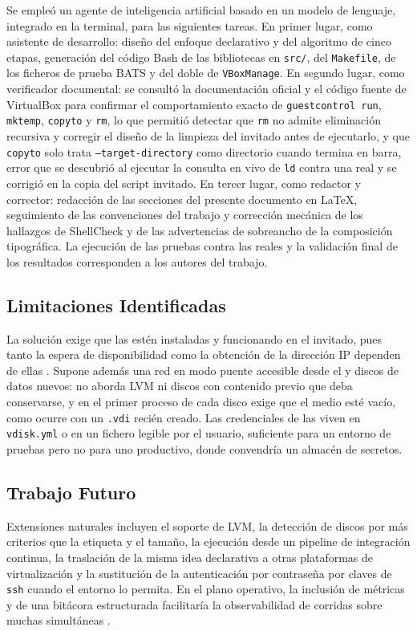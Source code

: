 Se empleó un agente de inteligencia artificial basado en un modelo de lenguaje, integrado en la terminal, para las siguientes tareas. En primer lugar, como asistente de desarrollo: diseño del enfoque declarativo y del algoritmo de cinco etapas, generación del código Bash de las bibliotecas en \texttt{src/}, del \texttt{Makefile}, de los ficheros de prueba BATS y del doble de \texttt{VBoxManage}. En segundo lugar, como verificador documental: se consultó la documentación oficial y el código fuente de VirtualBox para confirmar el comportamiento exacto de \texttt{guestcontrol run}, \texttt{mktemp}, \texttt{copyto} y \texttt{rm}, lo que permitió detectar que \texttt{rm} no admite eliminación recursiva y corregir el diseño de la limpieza del invitado antes de ejecutarlo, y que \texttt{copyto} solo trata \texttt{--target-directory} como directorio cuando termina en barra, error que se descubrió al ejecutar la consulta en vivo de \texttt{ld} contra una \vm{} real y se corrigió en la copia del script invitado. En tercer lugar, como redactor y corrector: redacción de las secciones del presente documento en \LaTeX{}, seguimiento de las convenciones del trabajo y corrección mecánica de los hallazgos de ShellCheck y de las advertencias de sobreancho de la composición tipográfica. La ejecución de las pruebas contra las \vm{} reales y la validación final de los resultados corresponden a los autores del trabajo.

\subsection{Limitaciones Identificadas}

La solución exige que las \guestadditions{} estén instaladas y funcionando en el invitado, pues tanto la espera de disponibilidad como la obtención de la dirección IP dependen de ellas \parencite{virtualbox_guestadditions}. Supone además una red en modo puente accesible desde el \host{} y discos de datos nuevos: no aborda LVM ni discos con contenido previo que deba conservarse, y en el primer proceso de cada disco exige que el medio esté vacío, como ocurre con un \texttt{.vdi} recién creado. Las credenciales de las \vm{} viven en \texttt{vdisk.yml} o en un fichero legible por el usuario, suficiente para un entorno de pruebas pero no para uno productivo, donde convendría un almacén de secretos.

\subsection{Trabajo Futuro}

Extensiones naturales incluyen el soporte de LVM, la detección de discos por más criterios que la etiqueta y el tamaño, la ejecución desde un pipeline de integración continua, la traslación de la misma idea declarativa a otras plataformas de virtualización y la sustitución de la autenticación por contraseña por claves de \texttt{ssh} cuando el entorno lo permita. En el plano operativo, la inclusión de métricas y de una bitácora estructurada facilitaría la observabilidad de corridas sobre muchas \vm{} simultáneas \parencite{ansible_up_running}.

